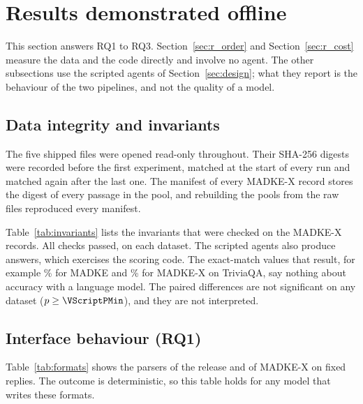 \section{Results demonstrated offline}
\label{sec:offline}

This section answers RQ1 to RQ3. Section~\ref{sec:r_order} and Section~\ref{sec:r_cost} measure the data and the code directly and involve no agent. The other subsections use the scripted agents of Section~\ref{sec:design}; what they report is the behaviour of the two pipelines, and not the quality of a model.

\subsection{Data integrity and invariants}
The five shipped files were opened read-only throughout. Their SHA-256 digests were recorded before the first experiment, matched at the start of every run and matched again after the last one. The manifest of every MADKE-X record stores the digest of every passage in the pool, and rebuilding the pools from the raw files reproduced every manifest.

Table~\ref{tab:invariants} lists the invariants that were checked on the MADKE-X records. All \VInvChecksAll{} checks passed, \VInvChecks{} on each dataset. The scripted agents also produce answers, which exercises the scoring code. The exact-match values that result, for example \VScriptEmRelTQA\% for MADKE and \VScriptEmXTQA\% for MADKE-X on TriviaQA, say nothing about accuracy with a language model. The paired differences are not significant on any dataset ($p\ge\VScriptPMin$), and they are not interpreted.



\subsection{Interface behaviour (RQ1)}
\label{sec:r_interface}
Table~\ref{tab:formats} shows the parsers of the release and of MADKE-X on fixed replies. The outcome is deterministic, so this table holds for any model that writes these formats.



